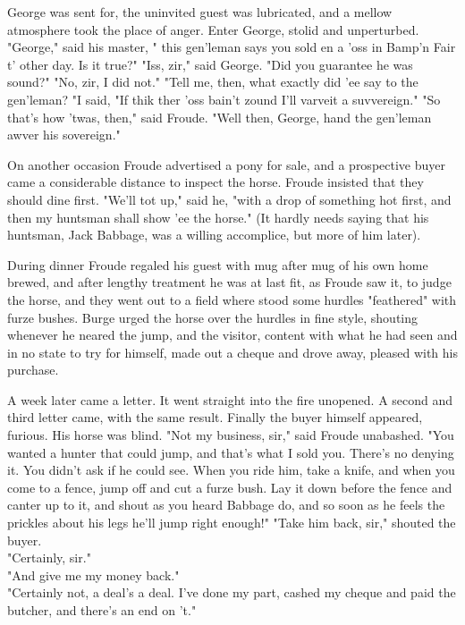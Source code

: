 George was sent for, the uninvited guest was lubricated, and a mellow atmosphere took the place of anger.
 Enter George, stolid and unperturbed.
 "George," said his master, " this gen'leman says you sold en a 'oss in Bamp'n Fair t' other day. Is it true?"
 "Iss, zir," said George. 
 "Did you guarantee he was sound?"
 "No, zir, I did not."
 "Tell me, then, what exactly did 'ee say to the gen'leman?
 "I said, "If thik ther 'oss bain't zound I'll varveit a suvvereign."
 "So that's how 'twas, then," said Froude. "Well then, George, hand the gen'leman awver his sovereign."

\Flourish

On another occasion Froude advertised a pony for sale, and a prospective buyer came a considerable distance to inspect the horse. Froude insisted that they should dine first. "We'll tot up," said he, "with a drop of something hot first, and then my huntsman shall show 'ee the horse." (It hardly needs saying that his huntsman, Jack Babbage, was a willing accomplice, but more of him later).

During dinner Froude regaled his guest with mug after mug of his own home brewed, and after lengthy treatment he was at last fit, as Froude saw it, to judge the horse, and they went out to a field where stood some hurdles "feathered" with furze bushes. Burge urged the horse over the hurdles in fine style, shouting whenever he neared the jump, and the visitor, content with what he had seen and in no state to try for himself, made out a cheque and drove away, pleased with his purchase.

A week later came a letter. It went straight into the fire unopened. A second and third letter came, with the same result. Finally the buyer himself appeared, furious. His horse was blind.
 "Not my business, sir," said Froude unabashed. "You wanted a hunter that could jump, and that's what I sold you. There's no denying it. You didn't ask if he could see. When you ride him, take a knife, and when you come to a fence, jump off and cut a furze bush. Lay it down before the fence and canter up to it, and shout as you heard Babbage do, and so soon as he feels the prickles about his legs he'll jump right enough!"
 "Take him back, sir," shouted the buyer.\\
 "Certainly, sir."\\
 "And give me my money back."\\
 "Certainly not, a deal's a deal. I've done my part, cashed my cheque and paid the butcher, and there's an end on 't." \\

